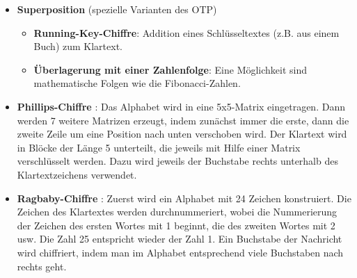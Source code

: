 \begin{refsegment}
\begin{itemize}
          Für diese Anforderung muss das Pad zufällig sein und es darf nur
          einmal benutzt werden (um jede Ähnlichkeit von Patterns aus dem
          Geheimtext zu eliminieren).\\
          Begründung: Gegeben sei Geheimtext C, Klartext P, Pad K, und zwei
          Klartexte, die jeweils mit dem gleichen Schlüssel verschlüsselt sind:
          C1 = P1 $\oplus$ K;  C2 = P2 $\oplus$ K; \\
          Damit ergibt sich C1 $\oplus$ C2 = (P1 $\oplus$ K) $\oplus$
                           (P2 $\oplus$ K) = P1 $\oplus$ P2. \\
          Diese Kombination kann die Klartexte \glqq durchsickern\grqq~lassen.\footnote{%
            In JCT kann man über den Menüeintrag
            {\bf Visualisierungen \textbackslash{} Viterbi} mit der automatischen
            Kryptoanalyse von Running-Key-Geheimtexten unter Verwendung der
            Viterbi-Analyse spielen. Und sehen wie erstaunlich es ist, wenn sich aus
	    den geXOR-ten Chiffraten oder den geXOR-ten Klartexten nach und nach beide
	    ursprünglichen Klartexte gewinnen lassen.
          }


\item {\bf Superposition} (spezielle Varianten des OTP)
   \begin{itemize}
      \item {\bf Running-Key-Chiffre}:
         Addition eines Schlüsseltextes (z.B. aus einem Buch) zum Klartext.

      \item {\bf Überlagerung mit einer Zahlenfolge}:
         Eine Möglichkeit sind mathematische Folgen wie die Fibonacci-Zahlen.
   \end{itemize}


\item {\bf Phillips-Chiffre} \cite{ACA2002}:
   Das Alphabet wird in eine 5x5-Matrix eingetragen. Dann werden 7 weitere
   Matrizen erzeugt, indem zunächst immer die erste, dann die zweite Zeile
   um eine Position nach unten verschoben wird. Der Klartext wird in Blöcke
   der Länge 5 unterteilt, die jeweils mit Hilfe einer Matrix verschlüsselt
   werden. Dazu wird jeweils der Buchstabe rechts unterhalb des
   Klartextzeichens verwendet.


\item {\bf Ragbaby-Chiffre} \cite{ACA2002}:
   Zuerst wird ein Alphabet mit 24 Zeichen konstruiert. Die Zeichen des
   Klartextes werden durchnummeriert, wobei die Nummerierung der Zeichen des
   ersten Wortes mit 1 beginnt, die des zweiten Wortes mit 2 usw. Die Zahl 25
   entspricht wieder der Zahl 1. Ein Buchstabe der Nachricht wird chiffriert,
   indem man im Alphabet entsprechend viele Buchstaben nach rechts geht.


\end{itemize}
\end{refsegment}
